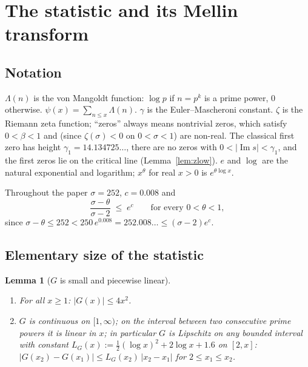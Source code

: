 \documentclass[11pt]{amsart}
\newtheorem{lemma}[theorem]{Lemma}
\numberwithin{equation}{section}
\newcommand{\im}{\operatorname{Im}}
\newcommand{\Sig}{\sigma}
\newcommand{\Lam}{\Lambda}
\newcommand{\Euler}{\gamma}
\begin{document}
\section{The statistic and its Mellin transform}\label{sec:statistic}

\subsection{Notation}

$\Lam(n)$ is the von Mangoldt function: $\log p$ if $n = p^k$ is a prime
power, $0$ otherwise. $\psi(x) = \sum_{n\le x}\Lam(n)$. $\Euler$ is the
Euler--Mascheroni constant. $\zeta$ is the Riemann zeta function;
``zeros'' always means nontrivial zeros, which satisfy
$0 < \beta < 1$ and (since $\zeta(\sigma)<0$ on $0<\sigma<1$) are
non-real. The classical first zero has height
$\gamma_1 = 14.134725\ldots$, there are no zeros with
$0<|\im s| < \gamma_1$, and the first zeros lie on the critical line
(Lemma~\ref{lem:zlow}). $e$ and $\log$ are the natural exponential and
logarithm; $x^{\theta}$ for real $x>0$ is $e^{\theta\log x}$.

Throughout the paper $\Sig = 252$, $c = 0.008$ and
\begin{equation}\label{eq:sigma-c}
\frac{\Sig - \theta}{\Sig - 2} \;\le\; e^{c}
\qquad\text{for every } 0 < \theta < 1,
\end{equation}
since $\Sig - \theta \le 252 < 250\,e^{0.008} = 252.008\ldots \le
(\Sig-2)e^{c}$.

\subsection{Elementary size of the statistic}

\begin{lemma}[$G$ is small and piecewise linear]\label{lem:G-size}\
\begin{enumerate}
\item For all $x \ge 1$: $|G(x)| \le 4x^2$.
\item $G$ is continuous on $[1,\infty)$; on the interval between two
consecutive prime powers it is linear in $x$; in particular $G$ is
Lipschitz on any bounded interval with constant
$L_G(x) := \tfrac12(\log x)^2 + 2\log x + 1.6$ on $[2, x]$:
$|G(x_2)-G(x_1)| \le L_G(x_2)\,|x_2-x_1|$ for $2 \le x_1 \le x_2$.
\end{enumerate}
\end{lemma}
\end{document}

